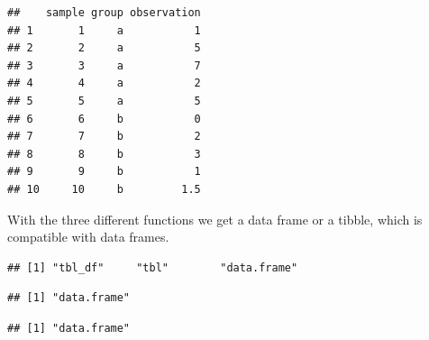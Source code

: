 \documentclass[krantz2,ChapterTOCs]{krantz}\usepackage{knitr}
\begin{document}
\begin{knitrout}\footnotesize
{}\color{fgcolor}\begin{kframe}
\begin{alltt}
 \hlkwb{<-} \hlstd{(}\hlstd{,}  \hlstd{=} \hlstd{)}
\end{alltt}
\begin{verbatim}
##    sample group observation
## 1       1     a           1
## 2       2     a           5
## 3       3     a           7
## 4       4     a           2
## 5       5     a           5
## 6       6     b           0
## 7       7     b           2
## 8       8     b           3
## 9       9     b           1
## 10     10     b         1.5
\end{verbatim}
\end{kframe}
\end{knitrout}

With the three different functions we get a data frame or a tibble, which is compatible with data frames.
\begin{knitrout}\footnotesize
{}\color{fgcolor}\begin{kframe}
\begin{alltt}
\end{alltt}
\begin{verbatim}
## [1] "tbl_df"     "tbl"        "data.frame"
\end{verbatim}
\begin{alltt}
\end{alltt}
\begin{verbatim}
## [1] "data.frame"
\end{verbatim}
\begin{alltt}
\end{alltt}
\begin{verbatim}
## [1] "data.frame"
\end{verbatim}
\end{kframe}
\end{knitrout}
\end{document}

